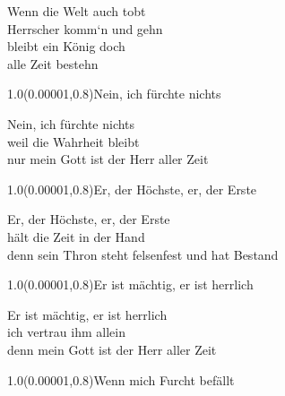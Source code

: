 \documentclass[aspectratio=169]{beamer}
\begin{document}
\color{white}
\begin{frame}
\centering
\color{white}
\huge{Wenn die Welt auch tobt} \\
\huge{Herrscher komm‘n und gehn} \\
\huge{bleibt ein König doch} \\
\huge{alle Zeit bestehn} \\

\begin{textblock}{1.0}(0.00001,0.8)\color{gray}\normalsize{Nein, ich fürchte nichts}\end{textblock}
\end{frame}

\begin{frame}
\centering
\color{white}
\huge{Nein, ich fürchte nichts} \\
\huge{weil die Wahrheit bleibt} \\
\huge{nur mein Gott ist der Herr aller Zeit} \\

\begin{textblock}{1.0}(0.00001,0.8)\color{gray}\normalsize{Er, der Höchste, er, der Erste}\end{textblock}
\end{frame}

\begin{frame}
\centering
\color{white}
\huge{Er, der Höchste, er, der Erste} \\
\huge{hält die Zeit in der Hand} \\
\huge{denn sein Thron steht felsenfest und hat Bestand} \\

\begin{textblock}{1.0}(0.00001,0.8)\color{gray}\normalsize{Er ist mächtig, er ist herrlich}\end{textblock}
\end{frame}

\begin{frame}
\centering
\color{white}
\huge{Er ist mächtig, er ist herrlich} \\
\huge{ich vertrau ihm allein} \\
\huge{denn mein Gott ist der Herr aller Zeit} \\

\begin{textblock}{1.0}(0.00001,0.8)\color{gray}\normalsize{Wenn mich Furcht befällt}\end{textblock}
\end{frame}
\end{document}
